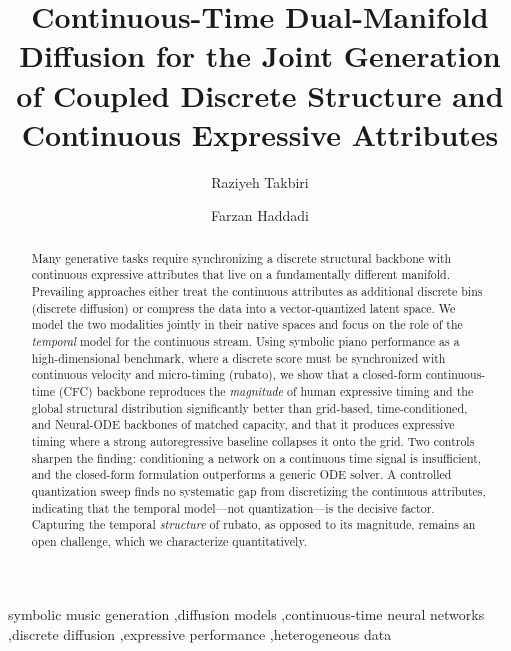 \documentclass[review]{elsarticle}
\begin{document}
\begin{frontmatter}

\title{Continuous-Time Dual-Manifold Diffusion for the Joint Generation of
Coupled Discrete Structure and Continuous Expressive Attributes}

\author[iust]{Raziyeh Takbiri}
\author[iust]{Farzan Haddadi}

\begin{abstract}
Many generative tasks require synchronizing a discrete structural backbone with
continuous expressive attributes that live on a fundamentally different manifold.
Prevailing approaches either treat the continuous attributes as additional discrete bins
(discrete diffusion) or compress the data into a vector-quantized latent space. We model
the two modalities jointly in their native spaces and focus on the role of the
\emph{temporal} model for the continuous stream. Using symbolic piano performance as a
high-dimensional benchmark, where a discrete score must be synchronized with continuous
velocity and micro-timing (rubato), we show that a closed-form continuous-time (CFC)
backbone reproduces the \emph{magnitude} of human expressive timing and the global
structural distribution significantly better than grid-based, time-conditioned, and
Neural-ODE backbones of matched capacity, and that it produces expressive timing where a
strong autoregressive baseline collapses it onto the grid. Two controls sharpen the
finding: conditioning a network on a continuous time signal is insufficient, and the
closed-form formulation outperforms a generic ODE solver. A controlled quantization sweep
finds no systematic gap from discretizing the continuous attributes, indicating that the
temporal model---not quantization---is the decisive factor. Capturing the temporal
\emph{structure} of rubato, as opposed to its magnitude, remains an open challenge, which we
characterize quantitatively.
\end{abstract}

\begin{keyword}
symbolic music generation \sep diffusion models \sep continuous-time neural networks
\sep discrete diffusion \sep expressive performance \sep heterogeneous data
\end{keyword}

\end{frontmatter}
\end{document}
